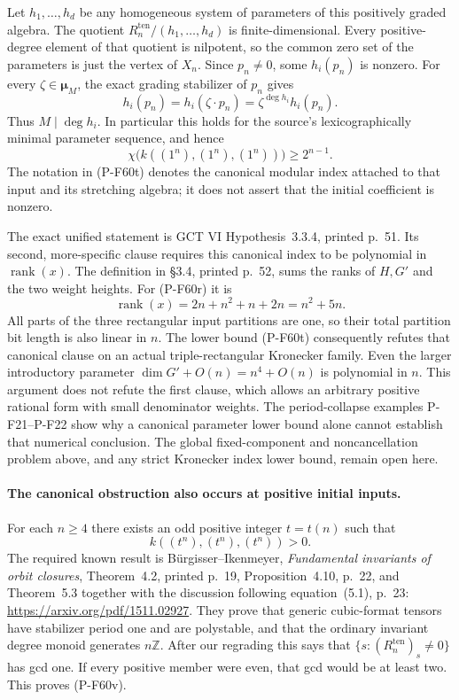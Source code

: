 Let $h_1,\ldots,h_d$ be any homogeneous system of
parameters of this positively graded algebra.  The quotient
$R^{\mathrm{ten}}_n/(h_1,\ldots,h_d)$ is finite-dimensional.
Every positive-degree element of that quotient is nilpotent,
so the common zero set of the parameters is just the
vertex of $X_n$.  Since $p_n\ne0$, some $h_i(p_n)$ is
nonzero.  For every $\zeta\in\boldsymbol\mu_M$, the exact
grading stabilizer of $p_n$ gives
\[
 h_i(p_n)=h_i(\zeta\cdot p_n)
                 =\zeta^{\deg h_i}h_i(p_n).
\]
Thus $M\mid\deg h_i$.  In particular this holds for the
source's lexicographically minimal parameter sequence,
and hence
\[
 \chi\bigl(k((1^n),(1^n),(1^n))\bigr)\ge2^{n-1}.
                                                        \tag{P-F60t}
\]
The notation in (P-F60t) denotes the canonical modular
index attached to that input and its stretching algebra;
it does not assert that the initial coefficient is nonzero.

The exact unified statement is GCT VI Hypothesis~3.3.4,
printed p.~51.  Its second, more-specific clause requires
this canonical index to be polynomial in $\operatorname{rank}(x)$.
The definition in \S3.4, printed p.~52, sums the ranks
of $H,G'$ and the two weight heights.  For (P-F60r) it is
\[
             \operatorname{rank}(x)=2n+n^2+n+2n=n^2+5n.
                                                        \tag{P-F60u}
\]
All parts of the three rectangular input partitions are
one, so their total partition bit length is also linear
in $n$.  The lower bound (P-F60t) consequently refutes
that canonical clause on an actual triple-rectangular
Kronecker family.  Even the larger introductory parameter
$\dim G'+O(n)=n^4+O(n)$ is polynomial in $n$.
This argument does not refute the first clause, which
allows an arbitrary positive rational form with small
denominator weights.  The period-collapse examples
P-F21--P-F22 show why a canonical parameter lower bound
alone cannot establish that numerical conclusion.
The global fixed-component and noncancellation problem
above, and any strict Kronecker index lower bound,
remain open here.

\paragraph{The canonical obstruction also occurs at positive initial inputs.}
For each $n\ge4$ there exists an odd positive integer
$t=t(n)$ such that
\[
        k((t^n),(t^n),(t^n))>0.
                                                        \tag{P-F60v}
\]
The required known result is B\"urgisser--Ikenmeyer,
\emph{Fundamental invariants of orbit closures},
Theorem~4.2, printed p.~19, Proposition~4.10, p.~22,
and Theorem~5.3 together with the discussion following
equation~(5.1), p.~23:
\url{https://arxiv.org/pdf/1511.02927}.
They prove that generic cubic-format tensors have
stabilizer period one and are polystable, and that the
ordinary invariant degree monoid generates $n\mathbb Z$.
After our regrading this says that
$\{s:(R^{\mathrm{ten}}_n)_s\ne0\}$ has gcd one.
If every positive member were even, that gcd would be
at least two.  This proves (P-F60v).

